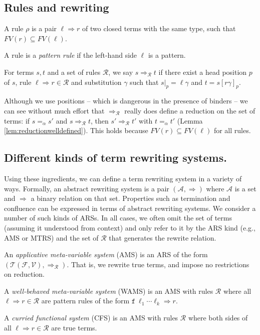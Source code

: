 \documentclass{lmcs}
\theoremstyle{theorem}\newtheorem{theorem}{Theorem}
\theoremstyle{theorem}\newtheorem{lemma}[theorem]{Lemma}
\theoremstyle{theorem}\newtheorem{corollary}[theorem]{Corollary}
\theoremstyle{definition}\newtheorem{definition}[theorem]{Definition}
\theoremstyle{definition}\newtheorem{example}[theorem]{Example}
\newcommand{\F}{\mathcal{F}}
\newcommand{\V}{\mathcal{V}}
\newcommand{\Terms}{\mathcal{T}}
\newcommand{\Rules}{\mathcal{R}}
\newcommand{\FV}{\mathit{FV}}
\newcommand{\identifier}[1]{\mathtt{#1}}
\newcommand{\afun}{\identifier{f}}
\newcommand{\arrz}{\Rightarrow}
\newcommand{\arr}[1]{\arrz_{#1}}
\begin{document}
\subsection{Rules and rewriting}

A rule $\rho$ is a pair $\ell \arrz r$ of two closed terms with the same type, such that
$\FV(r) \subseteq \FV(\ell)$.

A rule is a \emph{pattern rule} if the left-hand side $\ell$ is a pattern.

For terms $s,t$ and a set of rules $\Rules$, we say $s \arr{\Rules} t$ if there exist a head
position $p$ of $s$, rule $\ell \arrz r \in \Rules$ and substitution $\gamma$ such that $s|_p =
\ell\gamma$ and $t = s[r\gamma]_p$.

Although we use positions -- which is dangerous in the presence of binders -- we can see without
much effort that $\arr{\Rules}$ really does define a reduction on the set of terms: if
$s =_\alpha s'$ and $s \arr{\Rules} t$, then $s' \arr{\Rules} t'$ with $t =_\alpha t'$ (Lemma
\ref{lem:reductionwelldefined}).  This holds because $\FV(r) \subseteq \FV(\ell)$ for all rules.

\subsection{Different kinds of term rewriting systems.}

Using these ingredients, we can define a term rewriting system in a variety of ways.  Formally,
an abstract rewriting system is a pair $(\mathcal{A},\arrz)$ where $\mathcal{A}$ is a set and
$\arrz$ a binary relation on that set.  Properties such as termination and confluence can be
expressed in terms of abstract rewriting systems.  We consider a number of such kinds of ARSs.
In all cases, we often omit the set of terms (assuming it understood from context) and only
refer to it by the ARS kind (e.g., AMS or MTRS) and the set of $\Rules$ that generates the
rewrite relation.

An \emph{applicative meta-variable system} (AMS) is an ARS of the form
$(\Terms(\F,\V),\arr{\Rules})$.  That is, we rewrite true terms, and impose no restrictions on
reduction.

A \emph{well-behaved meta-variable system} (WAMS) is an AMS with rules $\Rules$ where all
$\ell \arrz r \in \Rules$ are pattern rules of the form $\afun\ \ell_1 \cdots \ell_k \arrz r$.

A \emph{curried functional system} (CFS) is an AMS with rules $\Rules$ where both sides of all
$\ell \arrz r \in \Rules$ are true terms.
\end{document}
